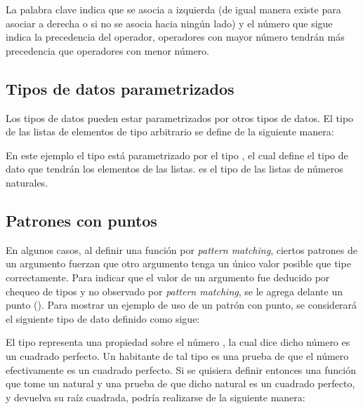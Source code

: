 La palabra clave  indica que se asocia a izquierda (de igual manera existe  para asociar a derecha o  si no se asocia hacia ningún lado) y el número que sigue indica la precedencia del operador, operadores con mayor número tendrán más precedencia que operadores con menor número.

\subsection{Tipos de datos parametrizados}\label{tipos:parametrized}

Los tipos de datos pueden estar parametrizados por otros tipos de datos. El tipo de las listas de elementos de tipo arbitrario se define de la siguiente manera:


En este ejemplo el tipo  está parametrizado por el tipo , el cual define el tipo de dato que tendrán los elementos de las listas.   es el tipo de las listas de números naturales. 


\subsection{Patrones con puntos}\label{tipos:puntos}

En algunos casos, al definir una función por \textit{pattern matching}, ciertos patrones de un argumento fuerzan que otro argumento tenga un único valor posible que tipe correctamente. Para indicar que el valor de un argumento fue deducido por chequeo de tipos y no observado por \textit{pattern matching},  se le agrega delante un punto (). Para mostrar un ejemplo de uso de un patrón con punto, se considerará el siguiente tipo de dato  definido como sigue:


El tipo   representa una propiedad sobre el número , la cual dice
dicho número es un cuadrado perfecto. Un habitante de tal tipo es una prueba de que el número  efectivamente es un cuadrado perfecto. Si se quisiera definir entonces una función  que tome un natural y una prueba de que dicho natural es un cuadrado perfecto, y devuelva su raíz cuadrada, podría realizarse de la siguiente manera:

